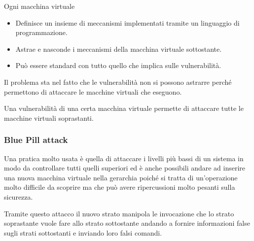 Ogni macchina virtuale
\begin{itemize}
	\item Definisce un insieme di meccanismi implementati tramite un linguaggio di programmazione.
	\item Astrae e nasconde i meccanismi della macchina virtuale sottostante.
	\item Può essere standard con tutto quello che implica sulle vulnerabilità.
\end{itemize}
Il problema sta nel fatto che le vulnerabilità non si possono astrarre perché permettono di attaccare le macchine
virtuali che eseguono.

Una vulnerabilità di una certa macchina virtuale permette di attaccare tutte le macchine virtuali soprastanti.

\subsubsection{Blue Pill attack}
Una pratica molto usata è quella di attaccare i livelli più bassi di un sistema in modo da controllare tutti quelli
superiori ed è anche possibili andare ad inserire una nuova macchina virtuale nella gerarchia poiché si tratta di
un'operazione molto difficile da scoprire ma che può avere ripercussioni molto pesanti sulla sicurezza.

Tramite questo attacco il nuovo strato manipola le invocazione che lo strato soprastante vuole fare allo strato
sottostante andando a fornire informazioni false sugli strati sottostanti e inviando loro falsi comandi.